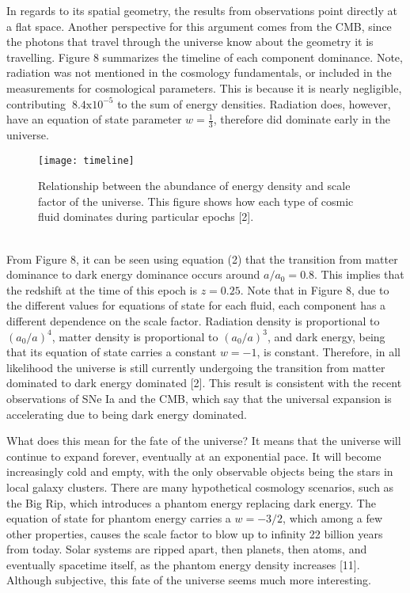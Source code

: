 \documentclass[12pt]{article}
\begin{document}
In regards to its spatial geometry, the results from observations point directly at a flat space. Another perspective for this argument comes from the CMB, since the photons that travel through the universe know about the geometry it is travelling. Figure 8 summarizes the timeline of each component dominance. Note, radiation was not mentioned in the cosmology fundamentals, or included in the measurements for cosmological parameters. This is because it is nearly negligible, contributing $~8.4 \text{x} 10^{-5}$ to the sum of energy densities. Radiation does, however, have an equation of state parameter $w=\frac{1}{3}$, therefore did dominate early in the universe.
\begin{figure}[h]
    \centering
    \texttt{[image: timeline]}
    \caption{Relationship between the abundance of energy density and scale factor of 	the universe. This figure shows how each type of cosmic fluid dominates during 	particular epochs [2].}
    \label{fig:mesh1}
\end{figure}
\\
From Figure 8, it can be seen using equation (2) that the transition from matter dominance to dark energy dominance occurs around $a/a_0=0.8$. This implies that the redshift at the time of this epoch is $z=0.25$. Note that in Figure 8, due to the different values for equations of state for each fluid, each component has a different dependence on the scale factor. Radiation density is proportional to $(a_0/a)^4$, matter density is proportional to $(a_0/a)^3$, and dark energy, being that its equation of state carries a constant $w=-1$, is constant. Therefore, in all likelihood the universe is still currently undergoing the transition from matter dominated to dark energy dominated [2]. This result is consistent with the recent observations of SNe Ia and the CMB, which say that the universal expansion is accelerating due to being dark energy dominated. 

What does this mean for the fate of the universe? It means that the universe will continue to expand forever, eventually at an exponential pace. It will become increasingly cold and empty, with the only observable objects being the stars in local galaxy clusters. There are many hypothetical cosmology scenarios, such as the Big Rip, which introduces a phantom energy replacing dark energy. The equation of state for phantom energy carries a $w=-3/2$, which among a few other properties, causes the scale factor to blow up to infinity 22 billion years from today. Solar systems are ripped apart, then planets, then atoms, and eventually spacetime itself, as the phantom energy density increases [11]. Although subjective, this fate of the universe seems much more interesting.
\end{document}
